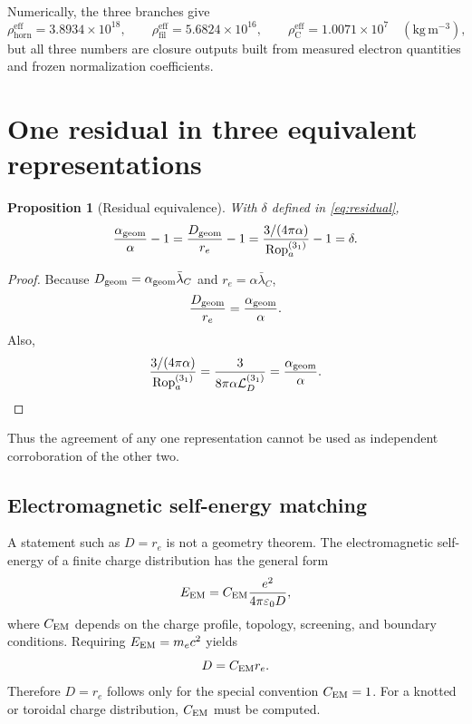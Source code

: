 \documentclass[aps,pre,preprint,notitlepage,nofootinbib,superscriptaddress]{revtex4-2}
\newcommand{\lC}{\bar\lambda_C}
\newcommand{\re}{r_e}
\newcommand{\Rop}{\operatorname{Rop}}
\newcommand{\calL}{\mathcal L}
\newcommand{\rhohorn}{\rho_{\mathrm{horn}}^{\mathrm{eff}}}
\newcommand{\rhofil}{\rho_{\mathrm{fil}}^{\mathrm{eff}}}
\newcommand{\rhoCeff}{\rho_{\mathrm C}^{\mathrm{eff}}}
\newtheorem{proposition}{Proposition}
\begin{document}
Numerically, the three branches give
\begin{equation}
  \rhohorn=3.8934\times10^{18},
  \qquad
  \rhofil=5.6824\times10^{16},
  \qquad
  \rhoCeff=1.0071\times10^{7}
  \quad
  (\mathrm{kg\,m^{-3}}),
  \label{eq:numerical-coefficients}
\end{equation}
but all three numbers are closure outputs built from measured electron quantities and frozen normalization coefficients.

\section{One residual in three equivalent representations}
\label{sec:residual-three}

\begin{proposition}[Residual equivalence]
\label{prop:residual}
With \(\delta\) defined in \cref{eq:residual},
\begin{equation}
  \frac{\alpha_{\rm geom}}{\alpha}-1
  =
  \frac{D_{\rm geom}}{\re}-1
  =
  \frac{3/(4\pi\alpha)}{\Rop_a^{(3_1)}}-1
  =
  \delta.
  \label{eq:three-faces}
\end{equation}
\end{proposition}

\begin{proof}
Because \(D_{\rm geom}=\alpha_{\rm geom}\lC\) and
\(\re=\alpha\lC\),
\[
\frac{D_{\rm geom}}{\re}
=
\frac{\alpha_{\rm geom}}{\alpha}.
\]
Also,
\[
\frac{3/(4\pi\alpha)}{\Rop_a^{(3_1)}}
=
\frac{3}{8\pi\alpha\calL_D^{(3_1)}}
=
\frac{\alpha_{\rm geom}}{\alpha}.
\]
\end{proof}

Thus the agreement of any one representation cannot be used as independent corroboration of the other two.

\subsection{Electromagnetic self-energy matching}

A statement such as \(D=\re\) is not a geometry theorem.  The electromagnetic self-energy of a finite charge distribution has the general form
\begin{equation}
  E_{\rm EM}
  =
  C_{\rm EM}
  \frac{e^2}{4\pi\varepsilon_0D},
  \label{eq:EM-shape}
\end{equation}
where \(C_{\rm EM}\) depends on the charge profile, topology, screening, and boundary conditions.  Requiring \(E_{\rm EM}=m_ec^2\) yields
\begin{equation}
  D=C_{\rm EM}\re.
  \label{eq:shape-match}
\end{equation}
Therefore \(D=\re\) follows only for the special convention \(C_{\rm EM}=1\).  For a knotted or toroidal charge distribution, \(C_{\rm EM}\) must be computed.
\end{document}
